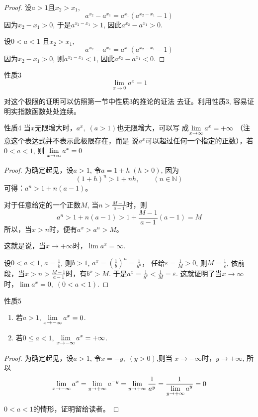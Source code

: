 \begin{proof}
设$a>1$且$x_2>x_1$,
\[a^{x_2}-a^{x_1}=a^{x_1}\left(a^{x_2-x_1}-1\right)\]
因为$x_2-x_1>0$, 于是$a^{x_2-x_1}>1$, 因此$a^{x_2}-a^{x_1}>0$.

设$0<a<1$ 且$x_2>x_1$,
\[a^{x_2}-a^{x_1}=a^{x_1}\left(a^{x_2-x_1}-1\right)\]
因为$x_2-x_1>0$, 则$a^{x_2-x_1}<1$, 因此$a^{x_2}-a^{x_1}<0$.  
\end{proof}

\begin{blk}{性质3}
\[\lim_{x\to 0} a^x=1\]
\end{blk}


对这个极限的证明可以仿照第一节中性质3的推论的证法
去证。利用性质3, 容易证明实指数函数处处连续。

\begin{blk}{性质4}
当$x$无限增大时，$a^x,\; (a>1)$也无限增大，可以写
成$\displaystyle\lim_{x\to\infty} a^x=+\infty$ （注意这个表达式并不表示此极限存在，而是
说$a^x$可以超过任何一个指定的正数），若$0<a<1$, 则
$\displaystyle\lim_{x\to\infty} a^x=0$
\end{blk}

\begin{proof}
  为确定起见，设$a>1$, 令$a=1+h\; (h>0)$, 因为
\[(1+h)^n>1+nh,\qquad (n\in\mathbb{N})\]
可得：$a^n>1+n(a-1)$。

对于任意给定的一个正数$M$, 当$n>\frac{M-1}{a-1}$时，则
\[a^n>1+n(a-1)>1+\frac{M-1}{a-1}(a-1)=M\]
所以，当$x>n$时，便有$a^x>a^n>M$。

这就是说，当$x\to +\infty$时，$\lim a^x=\infty$.

设$0<a<1$, $a=\frac{1}{b}$, 则$b>1$, $a^x=\left(\frac{1}{b}\right)^n=\frac{1}{b^n}$，
任给$\varepsilon=\frac{1}{M}>0$, 则$M=\frac{1}{\varepsilon}$, 依前段，当$x>n>\frac{M-1}{a-1}$时，有$b^x>M$. 于是$a^x=\frac{1}{b^x}<\frac{1}{M}=\varepsilon$. 这就证明了当$x\to\infty$时，$\lim a^x=0,\; (0<a<1)$.
\end{proof}

\begin{blk}{性质5}
\begin{enumerate}
  \item 若$a>1$, $\displaystyle\lim_{x\to-\infty} a^x=0$.
  \item 若$0\le a<1$, $\displaystyle\lim_{x\to-\infty} a^x=+\infty$.
\end{enumerate}  
\end{blk}

\begin{proof}
为确定起见，设$a>1$, 令$x=-y,\; (y>0)$,则当
$x\to-\infty$时，$y\to +\infty$, 所以
\[\displaystyle\lim_{x\to-\infty} a^x=\displaystyle\lim_{y\to +\infty} a^{-y}=\displaystyle\lim_{y\to +\infty}\dfrac{1}{a^y}=\dfrac{1}{\displaystyle\lim_{y\to +\infty}a^y}=0\]

$0<a<1$的情形，证明留给读者。
\end{proof}

